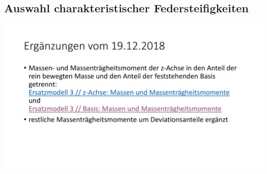 \documentclass[10pt,xcolor=dvipsnames]{beamer}
\begin{document}
	\subsection{Auswahl charakteristischer Federsteifigkeiten}
		\begin{frame}
			\includegraphics[width=\linewidth,page=10]{./pics/swarovski.pdf}
		\end{frame}
\end{document}
